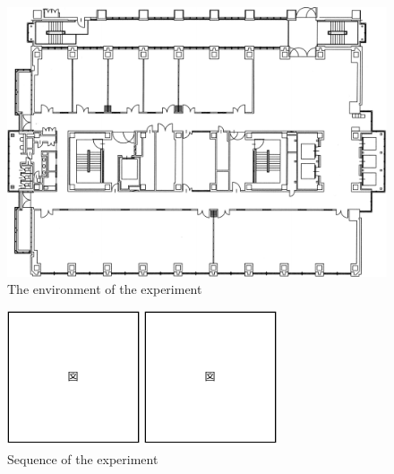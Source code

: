   \begin{figure}[h]
    \centering
    \includegraphics[keepaspectratio, scale=0.70] {images/pdf/RobotGuidance_cit3f}
    \captionsetup{justification=raggedright} %
    \caption{The environment of the experiment}
    \label{Fig:RobotGuidance_cit3f}
  \end{figure}

  \begin{figure}[h]
    \centering
    \begin{minipage}[c]{65mm} 
        \centering
        \includegraphics[height=40mm]{images/pdf/figure}
    \end{minipage}
    \begin{minipage}[c]{65mm} 
        \centering
        \includegraphics[height=40mm]{images/pdf/figure}
    \end{minipage}
    \caption{Sequence of the experiment}
    \label{Fig:Sequence of the experiment}
  \end{figure}

\newpage
